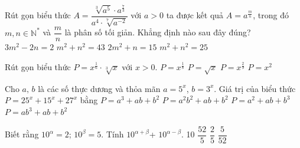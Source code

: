 \begin{ex}%
	Rút gọn biểu thức $A=\dfrac{\sqrt[3]{a^5}\cdot  a^{\tfrac{7}{3}}}{a^4\cdot\sqrt[7]{a^{-2}}}$ với $a > 0$ ta được kết quả $A=a^{\tfrac{m}{n}}$, trong đó $m, n\in\mathbb{N}^*$ và $\dfrac{m}{n}$ là phân số tối giản. Khẳng định nào sau đây đúng?
	\choice 
		 {$3m^2-2n=2$}
		{$m^2+n^2=43$} 
		 {\True $2m^2+n=15$}
		{$m^2+n^2=25$} 
\end{ex}

\begin{ex}%
	Rút gọn biểu  thức $P=x^{\frac{1}{6}} \cdot \sqrt[3]{x}$ với $x>0$.
	 \choice
		{$P=x^{\frac{1}{8}}$} 
		 {\True $P=\sqrt{x}$}
		{$P=x^{\frac{2}{9}}$} 
		 {$P=x^2$}
\end{ex}

\begin{ex}%
	Cho $a,\,b$ là các số thực  dương và thỏa mãn $a=5^x$, $b=3^x$. Giá trị của biểu thức $P=25^x+15^x+27^x$ bằng
	 \choice
		{$P=a^3+ab+b^2$} 
		 {$P=a^2b^2+ab+b^2$}
		{\True $P=a^2+ab+b^3$} 
		 {$P=a{b^3}+ab+b^2$}
\end{ex}

\begin{ex}%
	Biết rằng  $10^\alpha=2$; $10^\beta = 5$. Tính $10^{\alpha+\beta}$+ $10^{\alpha-\beta}$.
	 \choice
		{10} 
		{\True  $\dfrac{52}{5}$}
		 {$\dfrac{2}{5}$}
		{$\dfrac{5}{52}$} 
\end{ex}

